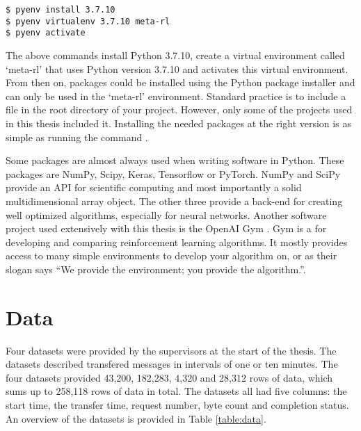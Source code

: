 \begin{verbatim}
$ pyenv install 3.7.10
$ pyenv virtualenv 3.7.10 meta-rl
$ pyenv activate
\end{verbatim}

The above commands install Python 3.7.10, create a virtual environment called
`meta-rl' that uses Python version 3.7.10 and activates this virtual
environment. From then on, packages could be installed using the Python
package installer  and can only be used in the `meta-rl'
environment. Standard practice is to include a  file in
the root directory of your project. However, only some of the projects used in
this thesis included it. Installing the needed packages at the right version
is as simple as running the command .

Some packages are almost always used when writing \ai software in Python.
These packages are NumPy, Scipy, Keras, Tensorflow or PyTorch\footnotemark.
NumPy and SciPy provide an API for scientific computing and most importantly a
solid multidimensional array object. The other three provide a back-end for
creating well optimized \ml algorithms, especially for neural networks.
Another software project used extensively with this thesis is the OpenAI Gym
\cite{gym2016}. Gym is a for developing and comparing reinforcement learning
algorithms. It mostly provides access to many simple environments to develop
your \rl algorithm on, or as their slogan says ``We provide the environment;
you provide the algorithm.''.



\section{Data}\label{sec:data}

Four datasets were provided by the supervisors at the start of the thesis. The
datasets described transfered messages in intervals of one or ten minutes. The
four datasets provided 43,200, 182,283, 4,320 and 28,312 rows of data, which
sums up to 258,118 rows of data in total. The datasets all had five columns:
the start time, the transfer time, request number, byte count and completion
status. An overview of the datasets is provided in Table \ref{table:data}.



